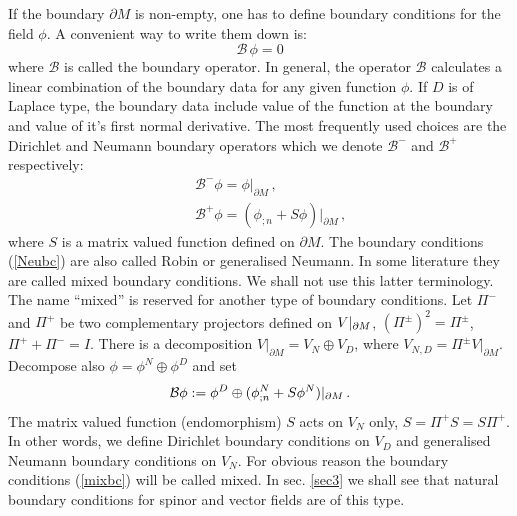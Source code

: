 If the boundary $\partial M$ is non-empty, one has to
define boundary conditions for the field $\phi$. A convenient
way to write them down is:
\begin{equation}
\mathcal{B}\,\phi =0 \label{boucon}
\end{equation}
where $\mathcal{B}$ is called the boundary operator. 
In general, the operator $\mathcal{B}$ calculates a linear combination
of the boundary data for any given function $\phi$. If $D$ is of Laplace
type, the boundary data include value of the function at the
boundary and value of it's first normal derivative.
The most frequently used
choices are the Dirichlet and Neumann boundary operators
which we denote $\mathcal{B}^-$ and $\mathcal{B}^+$ respectively:
\begin{eqnarray}
&&\mathcal{B}^-\phi =\phi\vert_{\partial M} \, ,\label{Dirbc} \\
&&\mathcal{B}^+\phi =(\phi_{;n}+S\phi )\vert_{\partial M} \, ,
\label{Neubc}
\end{eqnarray}
where $S$ is a matrix valued function defined on $\partial M$.
The boundary conditions (\ref{Neubc}) are also
called Robin or generalised Neumann. In some literature they
are called mixed boundary conditions. We shall not use this latter
terminology. The name ``mixed'' is reserved for another type
of boundary conditions. Let $\Pi^-$ and $\Pi^+$ be two
complementary projectors defined on $V\vert_{\partial M}$, $(\Pi^\pm)^2=\Pi^\pm$,
$\Pi^++\Pi^-=I$.
There is a decomposition
$ V|_{\partial M}=V_N\oplus V_D$, where $V_{N,D}
=\Pi^\pm V|_{\partial M}$. Decompose also 
$\phi=\phi^N\oplus\phi^D$ and set
\begin{equation}
\mathcal{B}\phi:=\phi^D\oplus(\phi^N_{;n}+S\phi^N)
\vert_{\partial M} \, .
\label{mixbc}
\end{equation}
The matrix valued function (endomorphism) $S$ acts on $V_N$ only, 
$S=\Pi^+S=S\Pi^+$. In other words, we define Dirichlet boundary
conditions on $V_D$ and generalised Neumann boundary conditions on $V_N$.
For obvious reason the boundary conditions (\ref{mixbc})
will be called mixed. In  sec. \ref{sec3} we shall see that natural
boundary conditions for spinor and vector fields are of this type.
